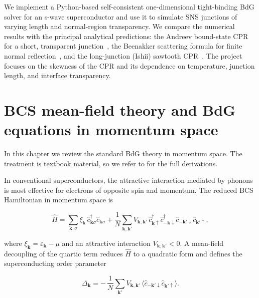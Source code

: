 \documentclass[11pt,a4paper,twoside,openany]{report}
\begin{document}
We implement a Python-based self-consistent one-dimensional tight-binding BdG solver for an s-wave superconductor and use it to simulate SNS junctions of varying length and normal-region transparency. We compare the numerical results with the principal analytical predictions: the Andreev bound-state CPR for a short, transparent junction~\cite{golubov_current-phase_2004}, the Beenakker scattering formula for finite normal reflection~\cite{beenaker_1992}, and the long-junction (Ishii) sawtooth CPR~\cite{ishii_josephson_1970, kulik_macroscopic_1969}.
The project focuses on the skewness of the CPR and its dependence on temperature, junction length, and interface transparency.



\chapter{BCS mean-field theory and BdG equations in momentum space}
\label{ch:BCS_BdG_momentum}

In this chapter we review the standard BdG theory in momentum space. The treatment is textbook material, so we refer to
\cite{bardeen_theory_1957, zhu_bogoliubov-gennes_2016, gennes_superconductivity_2018} for the full derivations.

In conventional superconductors, the attractive interaction mediated by phonons
is most effective for electrons of opposite spin and momentum.
The reduced BCS Hamiltonian in momentum space is

\begin{equation}\label{eq:BCS_original}
  \hat{H} = \sum_{\mathbf{k},\sigma} \xi_{\mathbf{k}} \,
            \hat{c}_{\mathbf{k}\sigma}^{\dagger} \hat{c}_{\mathbf{k}\sigma}
            + \frac{1}{N} \sum_{\mathbf{k},\mathbf{k}'} V_{\mathbf{k},\mathbf{k}'}\,
            \hat{c}_{\mathbf{k}\uparrow}^{\dagger} \hat{c}_{-\mathbf{k}\downarrow}^{\dagger}
            \hat{c}_{-\mathbf{k}'\downarrow} \hat{c}_{\mathbf{k}'\uparrow},
\end{equation}

where $\xi_{\mathbf{k}} = \varepsilon_{\mathbf{k}} - \mu$ and an attractive interaction $V_{\mathbf{k},\mathbf{k}'}<0$. A mean-field decoupling of the quartic term reduces $\hat{H}$ to a quadratic form and defines the
superconducting order parameter 

\begin{equation}\label{eq:Deltak_def}
\Delta_{\mathbf{k}} = -\,\frac{1}{N} \sum_{\mathbf{k}'} V_{\mathbf{k},\mathbf{k}'} \,
                       \langle \hat{c}_{-\mathbf{k}'\downarrow} \hat{c}_{\mathbf{k}'\uparrow} \rangle.
\end{equation}
\end{document}
